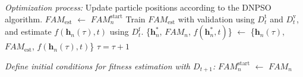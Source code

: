 \begin{algorithm*}[t]
{\begin{minipage}{0.97\linewidth}
\begin{algorithmic}[1]
			\Statex\vspace{6pt}\textit{Optimization process:}\vspace{3pt}
									\label{l:c2_opt}
				\State Update particle positions according to the DNPSO algorithm.			
																														\label{l:c2_newPos}
						\label{l:c2_fUpdate}
					\State $\textit{FAM}_\text{est}$ $\leftarrow$   \label{l:c2_famUpdate}
								 $\textit{FAM}_n^\text{start}$
					\State Train $\textit{FAM}_\text{est}$ with validation using
								 $D_t^\text{t}$ and $D_t^\text{v}$, and estimate
								 $f(\textbf{h}_n(\tau),t)$ using $D_t^\text{f}$.
								 																						\label{l:c2_trnOpt}
																																											\label{l:c2_ifNewP}
						\State \{$\textbf{h}^*_n$, $\textit{FAM}_n$,
										 $f(\textbf{h}^*_n,t)$\} $\leftarrow$ 
									 \{$\textbf{h}_n(\tau)$, $\textit{FAM}_\text{est}$,
									   $f(\textbf{h}_n(\tau),t)$\}				 \label{l:c2_pAssign}
					\EndIf 																				 \label{l:c2_endifNewP}
				\EndFor																					 \label{l:c2_endfUpdate}
				\State $\tau = \tau + 1$											 	 \label{l:c2_itUpdate}
			\EndWhile 																				 \label{l:c2_endOpt}

			\Statex\vspace{6pt}\textit{Define initial conditions for fitness
						 estimation with $D_{t+1}$:}\vspace{3pt}
					\label{l:c2_sUpdate}
				\State $\textit{FAM}_n^\text{start}$ $\leftarrow$ $\textit{FAM}_n$
			\EndFor																						\label{l:c2_endsUpdate}
	\end{algorithmic}
	\end{minipage} }
\end{algorithm*}

